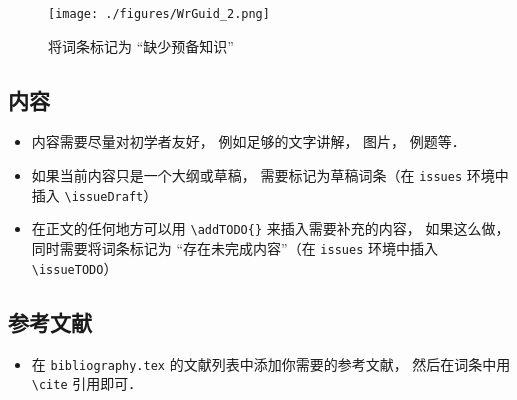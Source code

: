 \begin{figure}[ht]
\centering
\texttt{[image: ./figures/WrGuid\_2.png]}
\caption{将词条标记为 “缺少预备知识”} \label{WrGuid_fig2}
\end{figure}

\subsection{内容}
\begin{itemize}
\item 内容需要尽量对初学者友好， 例如足够的文字讲解， 图片， 例题等．
\item 如果当前内容只是一个大纲或草稿， 需要标记为草稿词条（在 \verb|issues| 环境中插入 \verb|\issueDraft|）
\item 在正文的任何地方可以用 \verb|\addTODO{}| 来插入需要补充的内容， 如果这么做， 同时需要将词条标记为 “存在未完成内容”（在 \verb|issues| 环境中插入 \verb|\issueTODO|）
\end{itemize}

\subsection{参考文献}
\begin{itemize}
\item 在 \verb|bibliography.tex| 的文献列表中添加你需要的参考文献， 然后在词条中用 \verb|\cite| 引用即可．
\end{itemize}
